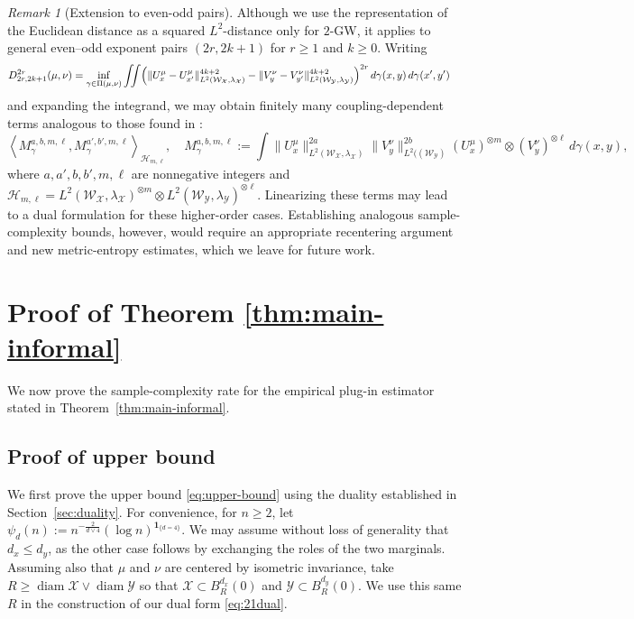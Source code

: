 \documentclass[11pt]{amsart}
\theoremstyle{definition}
\theoremstyle{remark}
\newtheorem{remark}[theorem]{Remark}
\newcommand{\1}{\mathbf{1}}
\numberwithin{equation}{section}
\begin{document}
\begin{remark}[Extension to even-odd pairs]
\label{rmk:even-odd}
Although we use the representation of the Euclidean distance as a squared $L^2$-distance only for $2$-GW, it applies to general even--odd exponent pairs $(2r,2k+1)$ for $r \geq 1$ and $k \geq 0$. Writing
\begin{align*}
D_{2r,2k+1}^{2r}(\mu,\nu)
&=
\inf_{\gamma\in\Pi(\mu,\nu)}
\iint
\Bigl(
\|U_x^\mu-U_{x'}^\mu\|_{L^2(\mathcal W_{\mathcal X},
\lambda_{\mathcal X})}^{4k+2}
-
\|V_y^\nu-V_{y'}^\nu\|_{L^2(\mathcal W_{\mathcal Y},
\lambda_{\mathcal Y})}^{4k+2}
\Bigr)^{2r}
\,d\gamma(x,y)\,d\gamma(x',y')
\end{align*}
and expanding the integrand, we may obtain finitely many coupling-dependent terms analogous to those found in \cite[Appendix A]{paliy2026empirical}:
\[
    \left\langle M_{\gamma}^{a,b,m,\ell},M_{\gamma}^{a',b',m,\ell} \right\rangle_{\mathcal{H}_{m,\ell}}, \quad 
    M_{\gamma}^{a,b,m,\ell} := \int \|U_x^\mu\|_{L^2(\mathcal W_{\mathcal X},
\lambda_{\mathcal X})}^{2a}\|V_y^\nu\|_{L^2((\mathcal W_{\mathcal Y})}^{2b} (U_x^\mu)^{\otimes m}\otimes (V_y^\nu)^{\otimes \ell}\,d\gamma(x,y),
\]
where $a,a',b,b',m,\ell$ are nonnegative integers and $\mathcal{H}_{m,\ell} = L^2(\mathcal W_{\mathcal X},\lambda_{\mathcal X})^{\otimes m}\otimes L^2(\mathcal W_{\mathcal Y},\lambda_{\mathcal Y})^{\otimes\ell}$. Linearizing these terms may lead to a dual formulation for these higher-order cases. Establishing analogous sample-complexity bounds, however, would require an appropriate recentering argument and new metric-entropy estimates, which we leave for future work.
\end{remark}
\section{Proof of Theorem \ref{thm:main-informal}}\label{sec:proofs-main-results}\label{pf:sample-theorem}
We now prove the sample-complexity rate for the empirical plug-in estimator stated in Theorem~\ref{thm:main-informal}.
\subsection{Proof of upper bound} \label{sec:pf-upper} We first prove the upper bound \eqref{eq:upper-bound} using the duality established in Section~\ref{sec:duality}. For convenience, for $n\geq2$, let
$\psi_d(n)
:=
n^{-\frac{2}{d\vee 4}}
(\log n)^{\mathbf 1_{\{d=4\}}}$. We may assume without loss of generality that $d_x\le d_y$, as the other
case follows by exchanging the roles of the two marginals. Assuming also that $\mu$ and $\nu$ are centered by isometric invariance, take
$R\geq  \operatorname{diam}\mathcal{X} \vee \operatorname{diam}\mathcal{Y}$ so
that $\mathcal{X} \subset B^{d_x}_R(0)$ and
$\mathcal{Y} \subset B^{d_y}_{R}(0)$. We use this same $R$
in the construction of our dual form \eqref{eq:21dual}.
\end{document}
